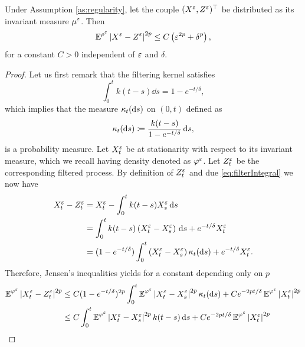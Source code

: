 \documentclass[10pt]{article}
\begin{document}
\begin{lemma}\label{lem:distanceZandX} Under Assumption \ref{as:regularity}, let the couple $(X^\varepsilon, Z^\varepsilon)^\top$ be distributed as its invariant measure $\mu^\varepsilon$. Then
	\begin{equation}
		\operatorname{\mathbb{E}}^{\rho^\varepsilon} \left\lvert X^\varepsilon - Z^\varepsilon\right\rvert^{2p} \leq C\left(\varepsilon^{2p} + \delta^p\right),
	\end{equation}
	for a constant $C > 0$ independent of $\varepsilon$ and $\delta$.
\end{lemma}
\begin{proof} Let us first remark that the filtering kernel satisfies
	\begin{equation}\label{eq:filterIntegral}
		\int_0^t k(t-s) \dd s = 1 - e^{-t/\delta},
	\end{equation}
	which implies that the measure $\kappa_t(\mathrm{d} s)$ on $(0, t)$ defined as
	\begin{equation}
		\kappa_t(\mathrm{d} s) \coloneqq \frac{k(t-s)}{1 - e^{-t/\delta}} \,\mathrm{d} s,
	\end{equation}
	is a probability measure. Let $X_t^\varepsilon$ be at stationarity with respect to its invariant measure, which we recall having density denoted as $\varphi^\varepsilon$. Let $Z_t^\varepsilon$ be the corresponding filtered process. By definition of $Z^\varepsilon_t$ and due \eqref{eq:filterIntegral} we now have
	\begin{equation}
	\begin{aligned}
		X_t^\varepsilon - Z_t^\varepsilon &= X_t^\varepsilon - \int_0^t k(t-s) X_s^\varepsilon \,\mathrm{d} s\\
		&= \int_0^t k(t - s) \left(X_t^\varepsilon - X_s^\varepsilon\right) \,\mathrm{d} s + e^{-t/\delta} X^\varepsilon_t\\
		&= (1 - e^{-t/\delta})\int_0^t \left(X_t^\varepsilon - X_s^\varepsilon\right) \kappa_t(\mathrm{d} s) + e^{-t/\delta} X^\varepsilon_t.
	\end{aligned}
	\end{equation}
	Therefore, Jensen's inequalities yields for a constant depending only on $p$
	\begin{equation}
	\begin{aligned}
		\operatorname{\mathbb{E}}^{\varphi^\varepsilon}\left\lvert X_t^\varepsilon - Z_t^\varepsilon\right\rvert^{2p} &\leq C (1 - e^{-t/\delta})^{2p} \int_0^t \operatorname{\mathbb{E}}^{\varphi^\varepsilon} \left\lvert X_t^\varepsilon - X_s^\varepsilon\right\rvert^{2p} \kappa_t (\mathrm{d} s) + C e^{-2pt/\delta} \operatorname{\mathbb{E}}^{\varphi^\varepsilon} \left\lvert X^\varepsilon_t\right\rvert^{2p}\\
		&\leq C\int_0^t \operatorname{\mathbb{E}}^{\varphi^\varepsilon} \left\lvert X_t^\varepsilon - X_s^\varepsilon\right\rvert^{2p} k(t-s) \,\mathrm{d} s + Ce^{-2pt/\delta} \operatorname{\mathbb{E}}^{\varphi^\varepsilon} \left\lvert X^\varepsilon_t\right\rvert^{2p}
	\end{aligned}
	\end{equation}

\end{proof}
\end{document}
